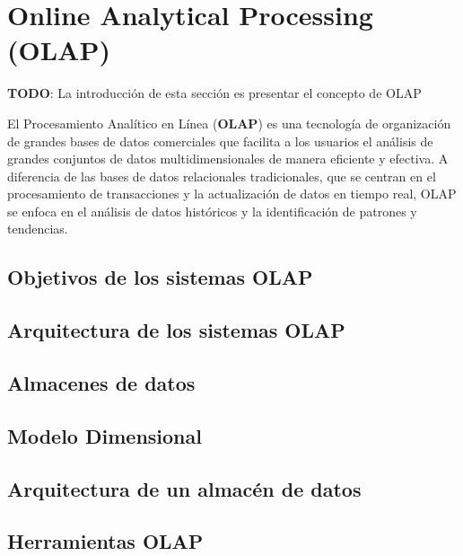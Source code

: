 \section{Online Analytical Processing (OLAP)} \label{section:olap}

\textbf{TODO}: La introducci\'on de esta secci\'on es presentar el concepto de OLAP

El Procesamiento Anal\'itico en L\'inea (\textbf{OLAP}) es una tecnología de organización de grandes bases de datos 
comerciales que facilita a los usuarios el an\'alisis de grandes conjuntos de datos multidimensionales de manera 
eficiente y efectiva. A diferencia de las bases de datos relacionales tradicionales, que se centran en el procesamiento 
de transacciones y la actualización de datos en tiempo real, OLAP se enfoca en el análisis de datos históricos y la 
identificación de patrones y tendencias. 

\subsection{Objetivos de los sistemas OLAP}
\subsection{Arquitectura de los sistemas OLAP}
\subsection{Almacenes de datos}
\subsection{Modelo Dimensional}
\subsection{Arquitectura de un almac\'en de datos}
\subsection{Herramientas OLAP}

